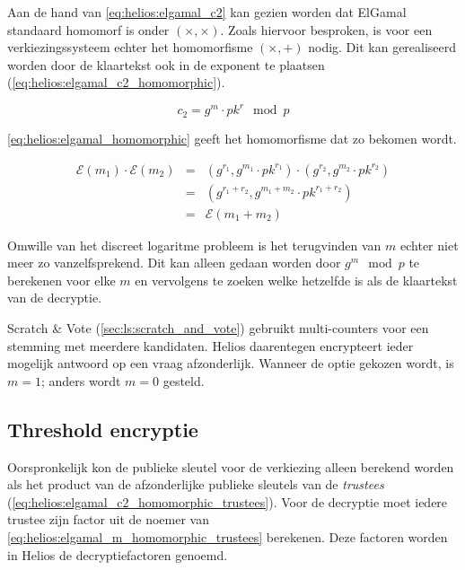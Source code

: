 \npar Aan de hand van \ref{eq:helios:elgamal_c2} kan gezien worden dat ElGamal standaard homomorf is onder $(\times, \times)$. Zoals hiervoor besproken, is voor een verkiezingssysteem echter het homomorfisme $(\times, +)$ nodig. Dit kan gerealiseerd worden door de klaartekst ook in de exponent te plaatsen (\ref{eq:helios:elgamal_c2_homomorphic}).

\begin{equation}
  \label{eq:helios:elgamal_c2_homomorphic}
  c_2 = g^m \cdot {pk}^r \mod{p}
\end{equation}

\ref{eq:helios:elgamal_homomorphic} geeft het homomorfisme dat zo bekomen wordt.

\begin{equation}
  \label{eq:helios:elgamal_homomorphic}
  \begin{array}{lcl}
    \mathcal{E}(m_1) \cdot \mathcal{E}(m_2) &=& (g^{r_1}, g^{m_1} \cdot {pk}^{r_1}) \cdot (g^{r_2}, g^{m_2} \cdot {pk}^{r_2}) \\
      &=& (g^{r_1 + r_2}, g^{m_1 + m_2} \cdot {pk}^{r_1 + r_2}) \\
      &=& \mathcal{E}(m_1 + m_2)
  \end{array}
\end{equation}

\npar Omwille van het discreet logaritme probleem is het terugvinden van $m$ echter niet meer zo vanzelfsprekend.\cite{menezes_vanstone_oorschot_handbook_of_applied_cryptography} Dit kan alleen gedaan worden door $g^m \mod{p}$ te berekenen voor elke $m$ en vervolgens te zoeken welke hetzelfde is als de klaartekst van de decryptie.

\npar Scratch \& Vote (\ref{sec:ls:scratch_and_vote}) gebruikt multi-counters voor een stemming met meerdere kandidaten. Helios daarentegen encrypteert ieder mogelijk antwoord op een vraag afzonderlijk. Wanneer de optie gekozen wordt, is $m = 1$; anders wordt $m = 0$ gesteld.

\subsection{Threshold encryptie}
\label{sec:helios:threshold_encryptie}

Oorspronkelijk kon de publieke sleutel voor de verkiezing alleen berekend worden als het product van de afzonderlijke publieke sleutels van de \textit{trustees} (\ref{eq:helios:elgamal_c2_homomorphic_trustees}). Voor de decryptie moet iedere trustee zijn factor uit de noemer van \ref{eq:helios:elgamal_m_homomorphic_trustees} berekenen. Deze factoren worden in Helios de decryptiefactoren genoemd.

